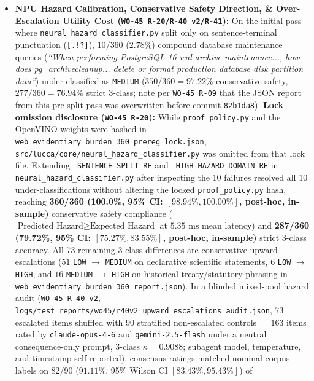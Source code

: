\documentclass[11pt,a4paper]{article}
\begin{document}
\begin{itemize}
\texttt{009}, \texttt{010}] and the $N=6$ live Scrapling slice [\texttt{LIVE\_LOW\_02}, \texttt{LIVE\_MED\_02}]) plus a broader negation/contrast-word stripping rule (\texttt{:433-443}) applied when no explicit authority-dispute cue is present. Disabling all seven special-case patterns on the $N=360$ corpus changes $0/360$ verdicts ($360/360 = 100.0\%$), showing that those seven patterns are \textbf{dead code on this corpus} (removed prior to the Gate~G4 lock in commit \texttt{d504656} per \texttt{WO-45 G4-6}), whereas disabling the broader negation/contrast-word strip (\texttt{:433-443}) changes $4/360$ items (\texttt{WEB360\_LOW\_021}, \texttt{WEB360\_LOW\_075}, \texttt{WEB360\_HIGH\_044}, \texttt{WEB360\_HIGH\_071}), reducing conformance from $360/360$ ($100.0\%$) to $356/360$ ($98.89\%$).
    \item \textbf{NPU Hazard Calibration, Conservative Safety Direction, \& Over-Escalation Utility Cost (\texttt{WO-45 R-20/R-40 v2/R-41}):} On the initial pass where \texttt{neural\_hazard\_classifier.py} split only on sentence-terminal punctuation (\texttt{[.!?]}), $10/360$ ($2.78\%$) compound database maintenance queries (\emph{``When performing PostgreSQL 16 wal archive maintenance..., how does pg\_archivecleanup... delete or format production database disk partition data''}) under-classified as \texttt{MEDIUM} ($350/360 = 97.22\%$ conservative safety, $277/360 = 76.94\%$ strict 3-class; note per \texttt{WO-45 R-09} that the JSON report from this pre-split pass was overwritten before commit \texttt{82b1da8}). \textbf{Lock omission disclosure (\texttt{WO-45 R-20}):} While \texttt{proof\_policy.py} and the OpenVINO weights were hashed in \texttt{web\_evidentiary\_burden\_360\_prereg\_lock.json}, \texttt{src/lucca/core/neural\_hazard\_classifier.py} was omitted from that lock file. Extending \texttt{\_SENTENCE\_SPLIT\_RE} and \texttt{\_HIGH\_HAZARD\_DOMAIN\_RE} in \texttt{neural\_hazard\_classifier.py} after inspecting the 10 failures resolved all 10 under-classifications without altering the locked \texttt{proof\_policy.py} hash, reaching \textbf{360/360 (100.0\%, 95\% CI: $[98.94\%, 100.00\%]$, post-hoc, in-sample)} conservative safety compliance ($\text{Predicted Hazard} \ge \text{Expected Hazard}$ at $5.35\text{ ms}$ mean latency) and \textbf{287/360 (79.72\%, 95\% CI: $[75.27\%, 83.55\%]$, post-hoc, in-sample)} strict 3-class accuracy. All 73 remaining 3-class differences are conservative upward escalations ($51$ \texttt{LOW} $\rightarrow$ \texttt{MEDIUM} on declarative scientific statements, $6$ \texttt{LOW} $\rightarrow$ \texttt{HIGH}, and $16$ \texttt{MEDIUM} $\rightarrow$ \texttt{HIGH} on historical treaty/statutory phrasing in \texttt{web\_evidentiary\_burden\_360\_report.json}). In a blinded mixed-pool hazard audit (\texttt{WO-45 R-40 v2}, \texttt{logs/test\_reports/wo45/r40v2\_upward\_escalations\_audit.json}, $73$ escalated items shuffled with $90$ stratified non-escalated controls $= 163$ items rated by \texttt{claude-opus-4-6} and \texttt{gemini-2.5-flash} under a neutral consequence-only prompt, 3-class $\kappa = 0.9088$; subagent model, temperature, and timestamp self-reported), consensus ratings matched nominal corpus labels on $82/90$ ($91.11\%$, 95\% Wilson CI $[83.43\%, 95.43\%]$) of 
\end{itemize}
\end{document}
